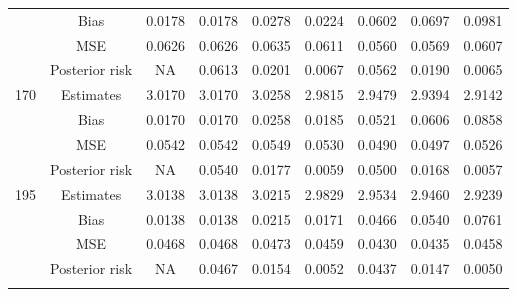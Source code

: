 \documentclass[a4paper,12pt]{report}
\begin{document}
{\begin{minipage}{\linewidth}
{\begin{tabular}{|c|c|c|c|c|c|c|c|c|}
			&Bias           &0.0178 &0.0178 &0.0278 &0.0224 &0.0602 &0.0697 &0.0981 \\
			&MSE            &0.0626 &0.0626 &0.0635 &0.0611 &0.0560 &0.0569 &0.0607 \\
			&Posterior risk    &NA &0.0613 &0.0201 &0.0067 &0.0562 &0.0190 &0.0065 \\ \hline
			170		&Estimates      &3.0170 &3.0170 &3.0258 &2.9815 &2.9479 &2.9394 &2.9142 \\
			&Bias           &0.0170 &0.0170 &0.0258 &0.0185 &0.0521 &0.0606 &0.0858 \\
			&MSE            &0.0542 &0.0542 &0.0549 &0.0530 &0.0490 &0.0497 &0.0526 \\
			&Posterior risk    &NA &0.0540 &0.0177 &0.0059 &0.0500 &0.0168 &0.0057 \\ \hline
			195		&Estimates      &3.0138 &3.0138 &3.0215 &2.9829 &2.9534 &2.9460 &2.9239 \\
			&Bias           &0.0138 &0.0138 &0.0215 &0.0171 &0.0466 &0.0540 &0.0761 \\
			&MSE            &0.0468 &0.0468 &0.0473 &0.0459 &0.0430 &0.0435 &0.0458 \\
			&Posterior risk    &NA &0.0467 &0.0154 &0.0052 &0.0437 &0.0147 &0.0050 \\ \hline
			\ECC
		\end{tabular}
	}
\end{minipage}

\newpage
{\\}

}
\end{document}
